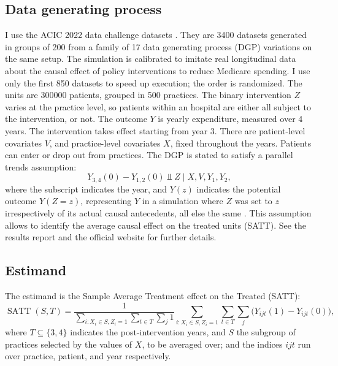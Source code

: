 \documentclass[a4paper]{article}
\theoremstyle{definition}
\begin{document}
    \subsection{Data generating process}

    I use the ACIC 2022 data challenge datasets \autocite{thal2023}. They are 3400 datasets generated in groups of 200 from a family of 17 data generating process (DGP) variations on the same setup. The simulation is calibrated to imitate real longitudinal data about the causal effect of policy interventions to reduce Medicare spending. I use only the first 850 datasets to speed up execution; the order is randomized. The units are \num{300000} patients, grouped in 500 practices. The binary intervention $Z$ varies at the practice level, so patients within an hospital are either all subject to the intervention, or not. The outcome $Y$ is yearly expenditure, measured over 4 years. The intervention takes effect starting from year 3. There are patient-level covariates $V$, and practice-level covariates $X$, fixed throughout the years. Patients can enter or drop out from practices. The DGP is stated to satisfy a parallel trends  assumption:
    \begin{equation}
        Y_{3,4}(0) - Y_{1,2}(0) \Perp Z \mid X, V, Y_1, Y_2, \label{eq:did}
    \end{equation}
    where the subscript indicates the year, and $Y(z)$ indicates the potential outcome $Y(Z=z)$, representing $Y$ in a simulation where $Z$ was set to $z$ irrespectively of its actual causal antecedents, all else the same \autocite{rubin1974,imbens2015}. This assumption allows to identify the average causal effect on the treated units (SATT). See the results report \autocite{thal2023} and the official website \autocite{lipman2022} for further details.

    \subsection{Estimand}

    The estimand is the Sample Average Treatment effect on the Treated (SATT):
    \begin{equation}
        \operatorname{SATT}(S,T) =
        \frac 1 {\sum_{i:X_i \in S, Z_i = 1} \sum_{t\in T} \sum_j 1}
        \sum_{i:X_i \in S, Z_i = 1} \sum_{t\in T} \sum_j
        \big(Y_{ijt}(1) - Y_{ijt}(0)\big), \label{eq:patientsatt}
    \end{equation}
    where $T\subseteq\{3,4\}$ indicates the post-intervention years, and $S$ the subgroup of practices selected by the values of $X$, to be averaged over; and the indices $ijt$ run over practice, patient, and year respectively.
\end{document}
